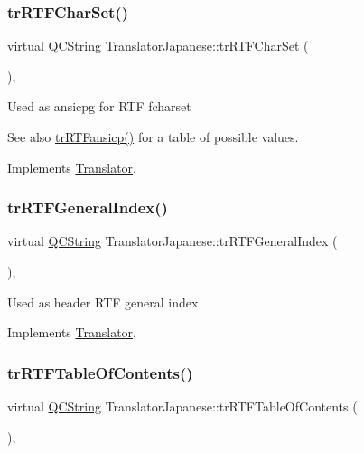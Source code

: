 \subsubsection{\texorpdfstring{trRTFCharSet()}{trRTFCharSet()}}
{\footnotesize\ttfamily virtual \mbox{\hyperlink{class_q_c_string}{Q\+C\+String}} Translator\+Japanese\+::tr\+R\+T\+F\+Char\+Set (\begin{DoxyParamCaption}{ }\end{DoxyParamCaption})\hspace{0.3cm}{\ttfamily [inline]}, {\ttfamily [virtual]}}

Used as ansicpg for R\+TF fcharset \begin{DoxySeeAlso}{See also}
\mbox{\hyperlink{class_translator_japanese_a1d3e75d8d22d0d3f04acd4339bba931d}{tr\+R\+T\+Fansicp()}} for a table of possible values. 
\end{DoxySeeAlso}


Implements \mbox{\hyperlink{class_translator_afad391f3cbfb5ce6332b7239f8e2049a}{Translator}}.

\mbox{\label{class_translator_japanese_a077e2e41ece9d5eb8f1312d4acb535f3}} 
\subsubsection{\texorpdfstring{trRTFGeneralIndex()}{trRTFGeneralIndex()}}
{\footnotesize\ttfamily virtual \mbox{\hyperlink{class_q_c_string}{Q\+C\+String}} Translator\+Japanese\+::tr\+R\+T\+F\+General\+Index (\begin{DoxyParamCaption}{ }\end{DoxyParamCaption})\hspace{0.3cm}{\ttfamily [inline]}, {\ttfamily [virtual]}}

Used as header R\+TF general index 

Implements \mbox{\hyperlink{class_translator}{Translator}}.

\mbox{\label{class_translator_japanese_a17418fd40efebdcce6a71679c57454f1}} 
\subsubsection{\texorpdfstring{trRTFTableOfContents()}{trRTFTableOfContents()}}
{\footnotesize\ttfamily virtual \mbox{\hyperlink{class_q_c_string}{Q\+C\+String}} Translator\+Japanese\+::tr\+R\+T\+F\+Table\+Of\+Contents (\begin{DoxyParamCaption}{ }\end{DoxyParamCaption})\hspace{0.3cm}{\ttfamily [inline]}, {\ttfamily [virtual]}}

